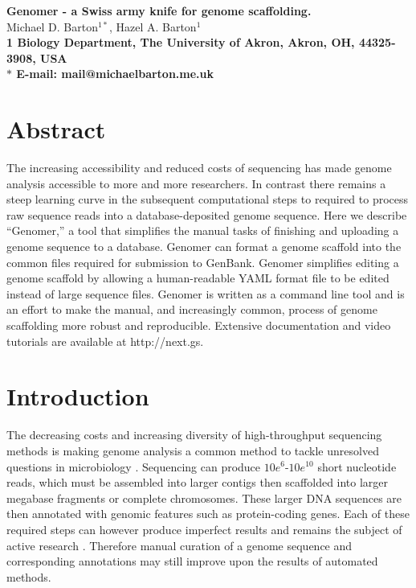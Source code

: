 \documentclass[10pt]{article}
\date{}
\begin{document}
\begin{flushleft}
{\Large
\textbf{Genomer - a Swiss army knife for genome scaffolding.}
}
\\
Michael D. Barton$^{1\ast}$, 
Hazel A. Barton$^{1}$
\\
\bf{1} Biology Department, The University of Akron, Akron, OH, 44325-3908, USA
\\
$\ast$ E-mail: mail@michaelbarton.me.uk
\end{flushleft}

\section*{Abstract}

The increasing accessibility and reduced costs of sequencing has made genome
analysis accessible to more and more researchers. In contrast there remains a
steep learning curve in the subsequent computational steps to required to
process raw sequence reads into a database-deposited genome sequence. Here we
describe ``Genomer,'' a tool that simplifies the manual tasks of finishing and
uploading a genome sequence to a database. Genomer can format a genome scaffold
into the common files required for submission to GenBank. Genomer simplifies
editing a genome scaffold by allowing a human-readable YAML format file to be
edited instead of large sequence files. Genomer is written as a command line
tool and is an effort to make the manual, and increasingly common, process of
genome scaffolding more robust and reproducible. Extensive documentation and
video tutorials are available at http://next.gs.

\section*{Introduction}

The decreasing costs and increasing diversity of high-throughput sequencing
methods is making genome analysis a common method to tackle unresolved
questions in microbiology \cite{loman2012b}. Sequencing can produce
$10e^{6}$-$10e^{10}$ short nucleotide reads, which must be assembled into
larger contigs then scaffolded into larger megabase fragments or complete
chromosomes. These larger DNA sequences are then annotated with genomic
features such as protein-coding genes. Each of these required steps can however
produce imperfect results and remains the subject of active research
\cite{earl2011,quail2012,beckloff2012}. Therefore manual curation of a genome
sequence and corresponding annotations may still improve upon the results of
automated methods.
\end{document}
